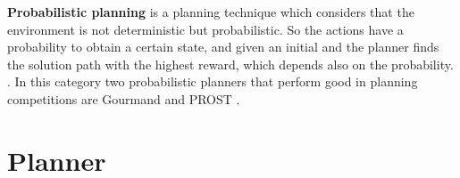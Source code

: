 \textbf{Probabilistic planning} is a planning technique which considers that the environment is not deterministic but probabilistic. So the actions have a  probability to obtain a certain state, and given an initial and  the planner  finds the solution path with the highest reward, which depends also on the probability. .
In this category two probabilistic planners that perform good in planning competitions are Gourmand \cite{Gourmand} and PROST \cite{PROST}.

\section{Planner}

